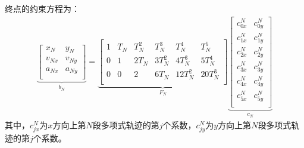 \documentclass[master,academic]{ysuthesis} %
\begin{document}
		终点的约束方程为：
		\begin{equation}
			\begin{aligned}
			\underbrace{\begin{bmatrix}
				x_N&		y_N\\
				v_{Nx}&		v_{Ny}\\
				a_{Nx}&		a_{Ny}\\
			\end{bmatrix}}_{b_N} =
			\underbrace{\begin{bmatrix}
				1&		T_N&		T_N^2&		T_N^3&		T_N^4&    	T_N^5\\
				0&		1&		2T_N&		3T_N^2&		4T_N^3&		5T_N^4\\
				0&		0&		2&		6T_N&		12T_N^2&		20T_N^3\\
			\end{bmatrix}}_{F_N} 
			\underbrace{\begin{bmatrix}
				c_{0x}^{N}&		c_{0y}^{N}\\
				c_{1x}^{N}&		c_{1y}^{N}\\
				c_{2x}^{N}&		c_{2y}^{N}\\
				c_{3x}^{N}&		c_{3y}^{N}\\
				c_{4x}^{N}&		c_{4y}^{N}\\
				c_{5x}^{N}&		c_{5y}^{N}\\
			\end{bmatrix}}_{c_N} 
			\end{aligned}
		\end{equation}
		其中，$c^N_{jx}$为$x$方向上第$N$段多项式轨迹的第$j$个系数，$c^N_{jy}$为$y$方向上第$N$段多项式轨迹的第$j$个系数。
		
\end{document}
